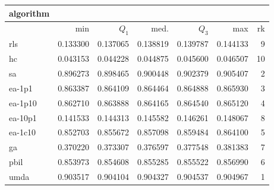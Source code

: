 \begin{tabular}{@{}l*{5}{>{{}}N{1}{3}}>{{}}N{2}{0}@{}}
\toprule
{algorithm} &  \\
\midrule
& {min} & {$Q_1$} & {med.} & {$Q_3$} & {max} & {rk}\\
\midrule
rls & 0.133300 & 0.137065 & 0.138819 & 0.139787 & 0.144133 & 9\\
hc & 0.043153 & 0.044228 & 0.044875 & 0.045600 & 0.046507 & 10\\
sa & 0.896273 & 0.898465 & 0.900448 & 0.902379 & {\color{blue}} 0.905407 & 2\\
ea-1p1 & 0.863387 & 0.864109 & 0.864464 & 0.864888 & 0.865930 & 3\\
ea-1p10 & 0.862710 & 0.863888 & 0.864165 & 0.864540 & 0.865120 & 4\\
ea-10p1 & 0.141533 & 0.144313 & 0.145582 & 0.146261 & 0.148067 & 8\\
ea-1c10 & 0.852703 & 0.855672 & 0.857098 & 0.859484 & 0.864100 & 5\\
ga & 0.370220 & 0.373307 & 0.376597 & 0.377548 & 0.381383 & 7\\
pbil & 0.853973 & 0.854608 & 0.855285 & 0.855522 & 0.856990 & 6\\
umda & {\color{blue}} 0.903517 & {\color{blue}} 0.904104 & {\color{blue}} 0.904327 & {\color{blue}} 0.904537 & 0.904967 & 1\\
\bottomrule
\end{tabular}
